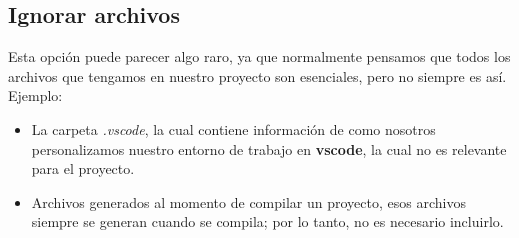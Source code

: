 \subsection{Ignorar archivos}

Esta opción puede parecer algo raro, ya que normalmente pensamos que todos los archivos 
que tengamos en nuestro proyecto son esenciales, pero no siempre es así. Ejemplo:

\begin{itemize}
	\item La carpeta \textit{.vscode}, la cual contiene información de como nosotros personalizamos nuestro entorno de trabajo en \textbf{vscode}, la cual no es relevante para el proyecto.
	\item Archivos generados al momento de compilar un proyecto, esos archivos siempre se generan cuando se compila; por lo tanto, no es necesario incluirlo.
\end{itemize}














